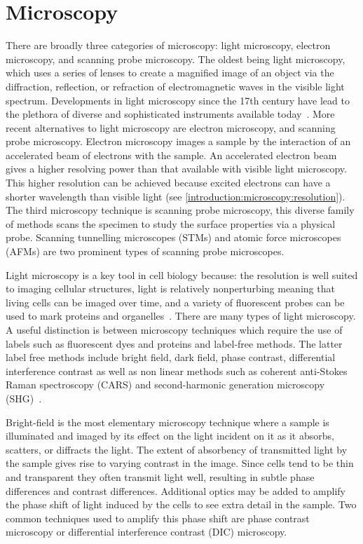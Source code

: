 \section{Microscopy}
\label{introduction:microscopy}
There are broadly three categories of microscopy: light microscopy, electron microscopy, and scanning probe microscopy. The oldest being light microscopy, which uses a series of lenses to create a magnified image of an object via the diffraction, reflection, or refraction of electromagnetic waves in the visible light spectrum. Developments in light microscopy since the 17th century have lead to the plethora of diverse and sophisticated instruments available today~\cite{Spector2006}. More recent alternatives to light microscopy are electron microscopy, and scanning probe microscopy. Electron microscopy images a sample by the interaction of an accelerated beam of electrons with the sample. An accelerated electron beam gives a higher resolving power than that available with visible light microscopy. This higher resolution can be achieved because excited electrons can have a shorter wavelength than visible light (see \autoref{introduction:microscopy:resolution}). The third microscopy technique is scanning probe microscopy, this diverse family of methods scans the specimen to study the surface properties via a physical probe. Scanning tunnelling microscopes (STMs) and atomic force microscopes (AFMs) are two prominent types of scanning probe microscopes.

Light microscopy is a key tool in cell biology because: the resolution is well suited to imaging cellular structures, light is relatively nonperturbing meaning that living cells can be imaged over time, and a variety of fluorescent probes can be used to  mark proteins and organelles~\cite{Thorn2016}. There are many types of light microscopy. A useful distinction is between microscopy techniques which require the use of labels such as fluorescent dyes and proteins and label-free methods. The latter label free methods  include bright field, dark field, phase contrast, differential interference contrast as well as non linear methods such as coherent anti-Stokes Raman spectroscopy (CARS) and second-harmonic generation microscopy (SHG)~\cite{Murphy2012}.

Bright-field is the most elementary microscopy technique where a sample is illuminated and imaged by its effect on the light incident on it as it absorbs, scatters, or diffracts the light. The extent of absorbency of transmitted light by the sample gives rise to varying contrast in the image. Since cells tend to be thin and transparent they often transmit light well, resulting in subtle phase differences and contrast differences. Additional optics may be added to amplify the phase shift of light induced by the cells to see extra detail in the sample. Two common techniques used to amplify this phase shift are phase contrast microscopy or differential interference contrast (DIC) microscopy.

